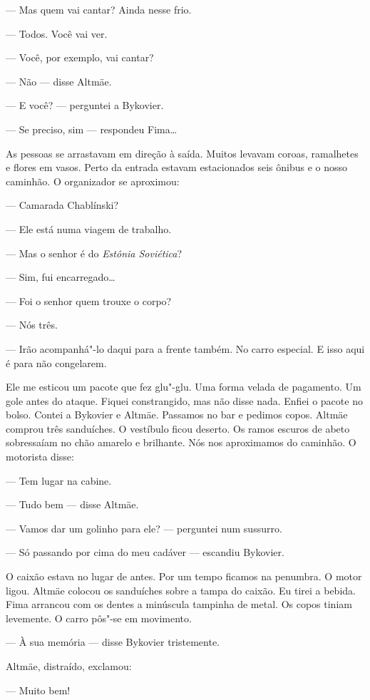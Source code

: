 --- Mas quem vai cantar? Ainda nesse frio.

--- Todos. Você vai ver.

--- Você, por exemplo, vai cantar?

--- Não --- disse Altmäe.

--- E você? --- perguntei a Bykovier.

--- Se preciso, sim --- respondeu Fima\ldots{}

As pessoas se arrastavam em direção à saída. Muitos levavam coroas,
ramalhetes e flores em vasos. Perto da entrada estavam estacionados seis
ônibus e o nosso caminhão. O organizador se aproximou:

--- Camarada Chablínski?

--- Ele está numa viagem de trabalho.

--- Mas o senhor é do \emph{Estônia Soviética}?

--- Sim, fui encarregado\ldots{}

--- Foi o senhor quem trouxe o corpo?

--- Nós três.

--- Irão acompanhá"-lo daqui para a frente também. No carro especial.
E isso aqui é para não congelarem.

Ele me esticou um pacote que fez glu"-glu. Uma forma velada de pagamento.
Um gole antes do ataque. Fiquei constrangido, mas não disse nada. Enfiei
o pacote no bolso. Contei a Bykovier e Altmäe. Passamos no bar e pedimos
copos. Altmäe comprou três sanduíches. O vestíbulo ficou deserto. Os
ramos escuros de abeto sobressaíam no chão amarelo e brilhante. Nós
nos aproximamos do caminhão. O motorista disse:

--- Tem lugar na cabine.

--- Tudo bem --- disse Altmäe.

--- Vamos dar um golinho para ele? --- perguntei num sussurro.

--- Só passando por cima do meu cadáver --- escandiu Bykovier.

O caixão estava no lugar de antes. Por um tempo ficamos na penumbra. O
motor ligou. Altmäe colocou os sanduíches sobre a tampa do caixão. Eu
tirei a bebida. Fima arrancou com os dentes a minúscula tampinha de
metal. Os copos tiniam levemente. O carro pôs"-se em movimento.

--- À sua memória --- disse Bykovier tristemente.

Altmäe, distraído, exclamou:

--- Muito bem!

